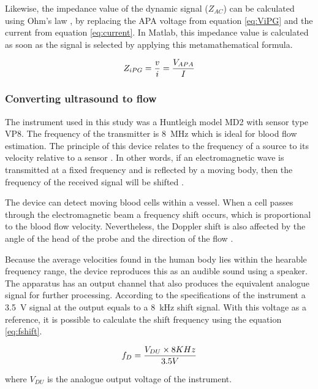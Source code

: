 Likewise, the impedance value of the dynamic signal ($Z_{AC}$) can be calculated using Ohm's law \cite{ohm1827galvanische}, by replacing the APA voltage from equation \ref{eq:ViPG} and the current from equation \ref{eq:current}. In Matlab, this impedance value is calculated as soon as the signal is selected by applying this metamathematical formula.

\begin{align}
	\label{eq:zipg}
	Z_{iPG}=\frac{v}{i} = \frac{V_{APA}}{I} \tagaddtext{[\si{\ohm}]}
\end{align}

\subsubsection{Converting ultrasound to flow}
\label{sectionDU}
The instrument used in this study was a Huntleigh model MD2 with sensor type VP8. The frequency of the transmitter is \SI{8}{\mega\hertz} which is ideal for blood flow estimation. The principle of this device relates to the frequency of a source to its velocity relative to a sensor \cite{surgeonhand2002Hand}. In other words, if an electromagnetic wave is transmitted at a fixed frequency and is reflected by a moving body, then the frequency of the received signal will be shifted \cite{ht:MD2}.  

The device can detect moving blood cells within a vessel. When a cell passes through the electromagnetic beam a frequency shift occurs, which is proportional to the blood flow velocity. Nevertheless, the Doppler shift is also affected by the angle of the head of the probe and the direction of the flow \cite{surgeonhand2002Hand}.

Because the average velocities found in the human body lies within the hearable frequency range, the device reproduces this as an audible sound using a speaker. The apparatus has an output channel that also produces the equivalent analogue signal for further processing. According to the specifications of the instrument a \SI{3.5}{\volt} signal at the output equals to a \SI{8}{\kilo\hertz} shift signal. With this voltage as a reference, it is possible to calculate the shift frequency using the equation \ref{eq:fshift}.

\begin{align}
	\label{eq:fshift}
	f_D = \frac{V_{DU} \times 8 KHz}{3.5V} \tagaddtext{[\si{\hertz}]}
\end{align}  

where $V_{DU}$ is the analogue output voltage of the instrument. 

